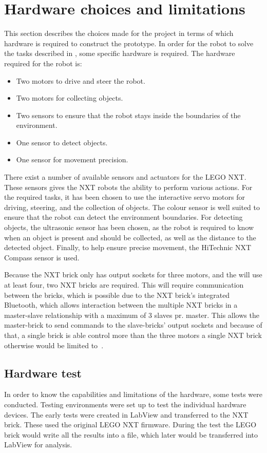 \section{Hardware choices and limitations}\label{sec:hardware}

This section describes the choices made for the project in terms of which hardware is required to construct the \projname{} prototype. In order for the robot to solve the tasks described in , some specific hardware is required. The hardware required for the robot is:

\begin{itemize}
\item Two motors to drive and steer the robot.
\item Two motors for collecting objects.
\item Two sensors to ensure that the robot stays inside the boundaries of the environment.
\item One sensor to detect objects.
\item One sensor for movement precision.
\end{itemize}

There exist a number of available sensors and actuators for the LEGO NXT. These sensors gives the NXT robots the ability to perform various actions. For the required tasks, it has been chosen to use the interactive servo motors for driving, steering, and the collection of objects. The colour sensor is well suited to ensure that the robot can detect the environment boundaries. For detecting objects, the ultrasonic sensor has been chosen, as the robot is required to know when an object is present and should be collected, as well as the distance to the detected object. Finally, to help ensure precise movement, the HiTechnic NXT Compass sensor is used.

Because the NXT brick only has output sockets for three motors, and the \projname{} will use at least four, two NXT bricks are required. This will require communication between the bricks, which is possible due to the NXT brick's integrated Bluetooth, which allows interaction between the multiple NXT bricks in a master-slave relationship with a maximum of 3 slaves pr. master. This allows the master-brick to send commands to the slave-bricks' output sockets and because of that, a single brick is able control more than the three motors a single NXT brick otherwise would be limited to~\citep{lego_edu_guide}.

\subsection{Hardware test} \label{sec:hardware_test}
In order to know the capabilities and limitations of the hardware, some tests were conducted. Testing environments were set up to test the individual hardware devices. The early tests were created in LabView and transferred to the NXT brick. These used the original LEGO NXT firmware. During the test the LEGO brick would write all the results into a file, which later would be transferred into LabView for analysis. 

